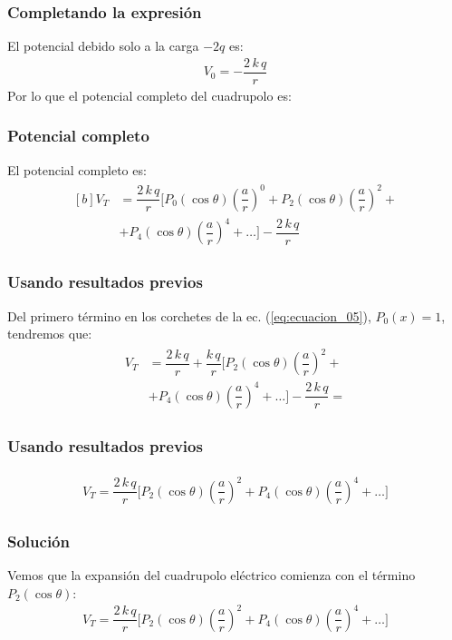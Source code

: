 \documentclass[12pt]{beamer}
\begin{document}
\begin{frame}
\frametitle{Completando la expresión}
El potencial debido solo a la carga $-2q$ es:
\pause
\begin{align*}
V_{0} = - \dfrac{2 \, k \, q}{r}
\end{align*}
\pause
Por lo que el potencial completo del cuadrupolo es:
\end{frame}
\begin{frame}
\frametitle{Potencial completo}
El potencial completo es:
\pause
\begin{align}
\begin{aligned}[b]
V_{T} &= \dfrac{2 \, k \, q}{r} \bigg[ P_{0} (\cos \theta) \left( \dfrac{a}{r} \right)^{0} + P_{2} (\cos \theta) \left( \dfrac{a}{r} \right)^{2} + \\[0.5em]
&+ P_{4} (\cos \theta) \left( \dfrac{a}{r} \right)^{4} + \ldots \bigg] - \dfrac{2 \, k \, q}{r}
\end{aligned}
\label{eq:ecuacion_05}
\end{align}
\end{frame}
\begin{frame}
\frametitle{Usando resultados previos}
Del primero término en los corchetes de la ec. (\ref{eq:ecuacion_05}), $P_{0}(x) = 1$, tendremos que:
\pause
\begin{eqnarray*}
\begin{aligned}
V_{T} &= \dfrac{2 \, k \, q}{r} + \dfrac{k \, q}{r} \bigg[ P_{2} (\cos \theta) \left( \dfrac{a}{r} \right)^{2} + \\[0.5em]
&+ P_{4} (\cos \theta) \left( \dfrac{a}{r} \right)^{4} + \ldots \bigg] - \dfrac{2 \, k \, q}{r} =
\end{aligned}
\end{eqnarray*}
\end{frame}
\begin{frame}
\frametitle{Usando resultados previos}
\begin{eqnarray*}
\begin{aligned}
V_{T} = \dfrac{2 \, k \, q}{r} \bigg[ P_{2} (\cos \theta) \left( \dfrac{a}{r} \right)^{2} + P_{4} (\cos \theta) \left( \dfrac{a}{r} \right)^{4} + \ldots \bigg]
\end{aligned}
\end{eqnarray*}
\end{frame}
\begin{frame}
\frametitle{Solución}
Vemos que la expansión del cuadrupolo eléctrico comienza con el término $P_{2} (\cos \theta)$:
\pause
\begin{align*}
V_{T} = \dfrac{2 \, k \, q}{r} \bigg[ P_{2} (\cos \theta) \left( \dfrac{a}{r} \right)^{2} + P_{4} (\cos \theta) \left( \dfrac{a}{r} \right)^{4} + \ldots \bigg]
\end{align*}
\end{frame}
\end{document}
